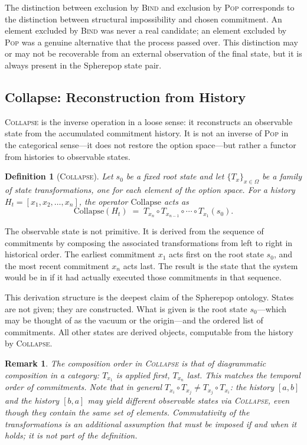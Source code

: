 \documentclass[12pt]{article}
\newtheorem{definition}{Definition}[section]
\newtheorem{remark}{Remark}[section]
\begin{document}
The distinction between exclusion by \textsc{Bind} and exclusion by \textsc{Pop} corresponds to the distinction between structural impossibility and chosen commitment. An element excluded by \textsc{Bind} was never a real candidate; an element excluded by \textsc{Pop} was a genuine alternative that the process passed over. This distinction may or may not be recoverable from an external observation of the final state, but it is always present in the Spherepop state pair.

\subsection{Collapse: Reconstruction from History}

\textsc{Collapse} is the inverse operation in a loose sense: it reconstructs an observable state from the accumulated commitment history. It is not an inverse of \textsc{Pop} in the categorical sense---it does not restore the option space---but rather a functor from histories to observable states.

\begin{definition}[\textsc{Collapse}]
Let $s_0$ be a fixed root state and let $\{T_x\}_{x \in \Omega}$ be a family of state transformations, one for each element of the option space. For a history $H_t = [x_1, x_2, \ldots, x_n]$, the operator $\mathrm{Collapse}$ acts as
\[
\mathrm{Collapse}(H_t) \;=\; T_{x_n} \circ T_{x_{n-1}} \circ \cdots \circ T_{x_1}(s_0).
\]
\end{definition}

The observable state is not primitive. It is derived from the sequence of commitments by composing the associated transformations from left to right in historical order. The earliest commitment $x_1$ acts first on the root state $s_0$, and the most recent commitment $x_n$ acts last. The result is the state that the system would be in if it had actually executed those commitments in that sequence.

This derivation structure is the deepest claim of the Spherepop ontology. States are not given; they are constructed. What is given is the root state $s_0$---which may be thought of as the vacuum or the origin---and the ordered list of commitments. All other states are derived objects, computable from the history by \textsc{Collapse}.

\begin{remark}
The composition order in \textsc{Collapse} is that of diagrammatic composition in a category: $T_{x_1}$ is applied first, $T_{x_n}$ last. This matches the temporal order of commitments. Note that in general $T_{x_i} \circ T_{x_j} \neq T_{x_j} \circ T_{x_i}$: the history $[a, b]$ and the history $[b, a]$ may yield different observable states via \textsc{Collapse}, even though they contain the same set of elements. Commutativity of the transformations is an additional assumption that must be imposed if and when it holds; it is not part of the definition.
\end{remark}
\end{document}
